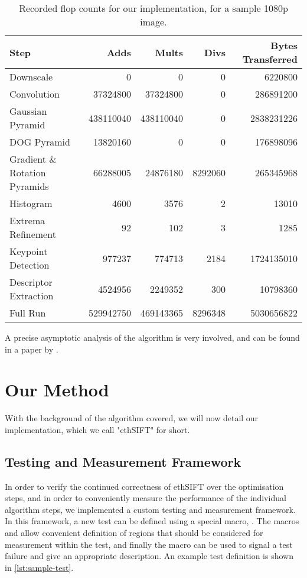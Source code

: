 \documentclass[letterpaper]{article}
\begin{document}
\begin{table*}[ht]
\centering
\begin{tabular}{lrrrr}
    Step & Adds & Mults & Divs & Bytes Transferred \\
    \hline
Downscale & 0 & 0 & 0 & 6220800 \\
Convolution & 37324800 & 37324800 & 0 & 286891200 \\
Gaussian Pyramid & 438110040 & 438110040 & 0 & 2838231226 \\
DOG Pyramid & 13820160 & 0 & 0 & 176898096 \\
Gradient \& Rotation Pyramids & 66288005 & 24876180 & 8292060 & 265345968 \\
Histogram & 4600 & 3576 & 2 & 13010 \\
Extrema Refinement & 92 & 102 & 3 & 1285 \\
Keypoint Detection & 977237 & 774713 & 2184 & 1724135010 \\
Descriptor Extraction & 4524956 & 2249352 & 300 & 10798360 \\
Full Run & 529942750 & 469143365 & 8296348 & 5030656822 \\
\end{tabular}
\caption{Recorded flop counts for our implementation, for a sample 1080p image.}
\label{tab:flop-counts}
\end{table*}

A precise asymptotic analysis of the algorithm is very involved, and can be found in a paper by \citet{vinukonda2011study}.

\section{Our Method}\label{sec:yourmethod}
With the background of the algorithm covered, we will now detail our implementation, which we call "ethSIFT" for short.

\subsection*{Testing and Measurement Framework}\label{sec:testing}
In order to verify the continued correctness of ethSIFT over the optimisation steps, and in order to conveniently measure the performance of the individual algorithm steps, we implemented a custom testing and measurement framework. In this framework, a new test can be defined using a special macro, . The macros  and  allow convenient definition of regions that should be considered for measurement within the test, and finally the macro  can be used to signal a test failure and give an appropriate description. An example test definition is shown in \autoref{lst:sample-test}.
\end{document}
